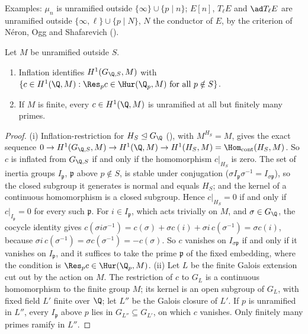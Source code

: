\noindent Examples: $\mu_n$ is unramified outside $\{\infty\}\cup\{p\mid n\}$; $E[n]$, $T_\ell E$ and $\ad T_\ell E$ are unramified outside $\{\infty,\ell\}\cup\{p\mid N\}$, $N$ the
conductor of $E$, by the criterion of N\'eron, Ogg and Shafarevich ().

\begin{proposition}\label{prop:galcoh:unramified-almost-everywhere}
Let $M$ be unramified outside $S$.
\begin{enumerate}[label=(\roman*)]
\item Inflation identifies $H^1(G_{\Q,S},M)$ with $\{c\in H^1(\Q,M):\Res_pc\in\Hur(\Q_p,M)\text{ for all }p\notin S\}$.
\item If $M$ is finite, every $c\in H^1(\Q,M)$ is unramified at all but finitely many primes.
\end{enumerate}
\end{proposition}

\begin{proof}
(i) Inflation-restriction for $H_S\trianglelefteq G_\Q$ (), with $M^{H_S}=M$, gives the exact sequence
$0\to H^1(G_{\Q,S},M)\to H^1(\Q,M)\to H^1(H_S,M)=\Hom_{\mathrm{cont}}(H_S,M)$. So $c$ is inflated from $G_{\Q,S}$ if and only if the homomorphism $c|_{H_S}$ is zero. The set of
inertia groups $I_{\mathfrak p}$, $\mathfrak p$ above $p\notin S$, is stable under conjugation ($\sigma I_{\mathfrak p}\sigma^{-1}=I_{\sigma\mathfrak p}$), so the closed subgroup it generates is
normal and equals $H_S$; and the kernel of a continuous homomorphism is a closed subgroup. Hence $c|_{H_S}=0$ if and only if $c|_{I_{\mathfrak p}}=0$ for every such $\mathfrak p$.
For $i\in I_{\mathfrak p}$, which acts trivially on $M$, and $\sigma\in G_\Q$, the cocycle identity gives $c(\sigma i\sigma^{-1})=c(\sigma)+\sigma c(i)+\sigma i\,c(\sigma^{-1})=\sigma c(i)$,
because $\sigma i\,c(\sigma^{-1})=\sigma c(\sigma^{-1})=-c(\sigma)$. So $c$ vanishes on $I_{\sigma\mathfrak p}$ if and only if it vanishes on $I_{\mathfrak p}$, and it suffices to take the
prime $\mathfrak p$ of the fixed embedding, where the condition is $\Res_pc\in\Hur(\Q_p,M)$.
(ii) Let $L$ be the finite Galois extension cut out by the action on $M$. The restriction of $c$ to $G_L$ is a continuous homomorphism to the finite group $M$; its kernel is
an open subgroup of $G_L$, with fixed field $L'$ finite over $\Q$; let $L''$ be the Galois closure of $L'$. If $p$ is unramified in $L''$, every $I_{\mathfrak p}$ above $p$
lies in $G_{L''}\subseteq G_{L'}$, on which $c$ vanishes. Only finitely many primes ramify in $L''$.
\end{proof}

